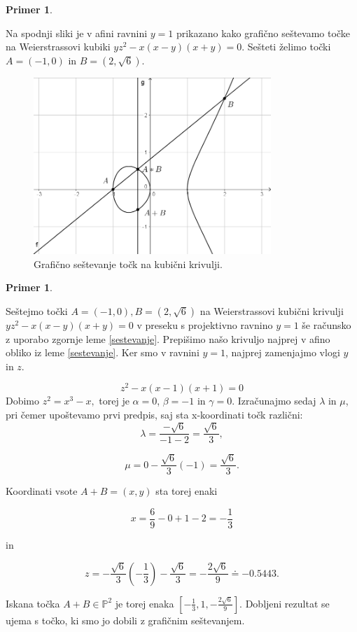 \documentclass[12pt,a4paper,twoside]{article}
\theoremstyle{definition} %
\newtheorem{primer}[definicija]{Primer}
\theoremstyle{plain} %
\numberwithin{equation}{section}  %
\newcommand{\PP}{\mathbb P}
\begin{document}
\begin{primer}~

Na spodnji sliki je v afini ravnini $y=1$ prikazano kako grafično seštevamo točke na Weierstrassovi kubiki $yz^2-x(x-y)(x+y)=0$. Sešteti želimo točki $A =(-1,0)$ in $B=(2,\sqrt{6}) $.
\\


\begin{figure}[h]
  \centering
  \includegraphics[width=0.8\textwidth]{images/adicija.png}
  \caption[Grafično seštevanje.]{Grafično seštevanje točk na kubični krivulji.}
  \label{fig:adicija}
\end{figure}

\end{primer}



\begin{primer}~

Seštejmo točki $A =(-1,0),B=(2,\sqrt{6}) $ na Weierstrassovi kubični krivulji $yz^2-x(x-y)(x+y)=0$ v preseku s projektivno ravnino $y=1$ še računsko z uporabo zgornje leme \ref{sestevanje}.
Prepišimo našo krivuljo najprej v afino obliko iz leme \ref{sestevanje}. Ker smo v ravnini $y=1$, najprej zamenjajmo vlogi $y$ in $z$.

$$z^2-x(x-1)(x+1) = 0 $$ 
Dobimo $z^2 = x^3-x,$
torej je $\alpha = 0$, $\beta = -1$ in $\gamma=0$. Izračunajmo sedaj $\lambda$ in $\mu$, pri čemer upoštevamo prvi predpis, saj sta x-koordinati točk različni:
$$\lambda = \frac{-\sqrt{6}}{-1-2} = \frac{\sqrt{6}}{3},$$

$$\mu = 0 - \frac{\sqrt{6}}{3} (-1) = \frac{\sqrt{6}}{3}.$$

Koordinati vsote $A+B=(x,y)$ sta torej enaki

$$x = \frac{6}{9} - 0+1-2=-\frac{1}{3}$$

in

$$z = -\frac{\sqrt{6}}{3}(-\frac{1}{3})-\frac{\sqrt{6}}{3}=-\frac{2\sqrt{6}}{9} \doteq -0.5443.$$

Iskana točka $A+B \in \PP^2$ je torej enaka $[-\frac{1}{3},1,-\frac{2\sqrt{6}}{9}]$. Dobljeni rezultat se ujema s točko, ki smo jo dobili z grafičnim seštevanjem.

\end{primer}
\end{document}
